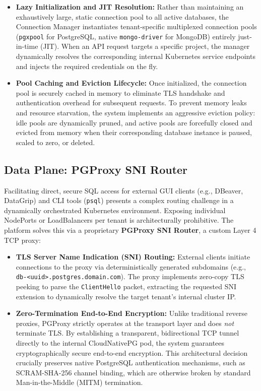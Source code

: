 \begin{itemize}
    \item \textbf{Lazy Initialization and JIT Resolution:} Rather than maintaining an exhaustively large, static connection pool to all active databases, the Connection Manager instantiates tenant-specific multiplexed connection pools (\texttt{pgxpool} for PostgreSQL, native \texttt{mongo-driver} for MongoDB) entirely just-in-time (JIT). When an API request targets a specific project, the manager dynamically resolves the corresponding internal Kubernetes service endpoints and injects the required credentials on the fly.
    \item \textbf{Pool Caching and Eviction Lifecycle:} Once initialized, the connection pool is securely cached in memory to eliminate TLS handshake and authentication overhead for subsequent requests. To prevent memory leaks and resource starvation, the system implements an aggressive eviction policy: idle pools are dynamically pruned, and active pools are forcefully closed and evicted from memory when their corresponding database instance is paused, scaled to zero, or deleted.
\end{itemize}

\subsection{Data Plane: PGProxy SNI Router}

Facilitating direct, secure SQL access for external GUI clients (e.g., DBeaver, DataGrip) and CLI tools (\texttt{psql}) presents a complex routing challenge in a dynamically orchestrated Kubernetes environment. Exposing individual NodePorts or LoadBalancers per tenant is architecturally prohibitive. The platform solves this via a proprietary \textbf{PGProxy SNI Router}, a custom Layer 4 TCP proxy:

\begin{itemize}
    \item \textbf{TLS Server Name Indication (SNI) Routing:} External clients initiate connections to the proxy via deterministically generated subdomains (e.g., \texttt{db-<uuid>.postgres.domain.com}). The proxy implements zero-copy TLS peeking to parse the \texttt{ClientHello} packet, extracting the requested SNI extension to dynamically resolve the target tenant's internal cluster IP.
    \item \textbf{Zero-Termination End-to-End Encryption:} Unlike traditional reverse proxies, PGProxy strictly operates at the transport layer and does \textit{not} terminate TLS. By establishing a transparent, bidirectional TCP tunnel directly to the internal CloudNativePG pod, the system guarantees cryptographically secure end-to-end encryption. This architectural decision crucially preserves native PostgreSQL authentication mechanisms, such as SCRAM-SHA-256 channel binding, which are otherwise broken by standard Man-in-the-Middle (MITM) termination.
\end{itemize}

